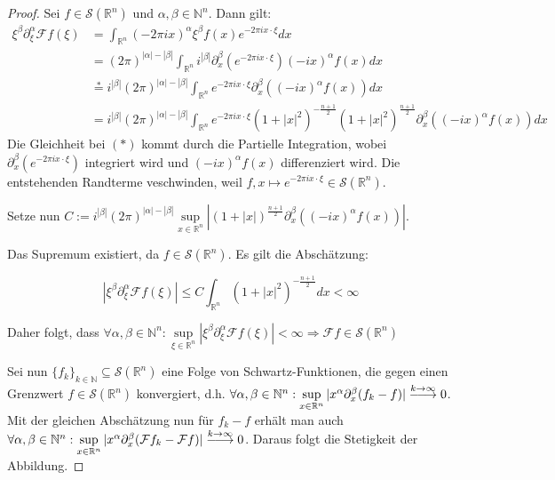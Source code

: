 \documentclass{article}
\newcommand{\R}[0]{\mathbb{R}}
\newcommand{\N}[0]{\mathbb{N}}
\newcommand{\F}[0]{\mathcal{F}}
\newcommand{\Ssp}[0]{\mathcal{S}}
\DeclareRobustCommand{\loongrightarrow}{%
  \DOTSB\relbar\joinrel\relbar\joinrel\rightarrow
}
\theoremstyle{plain}
\theoremstyle{definition}
\begin{document}
\begin{proof}\cite[S. 424, Theorem 24.1.1]{ebert2018methods}
    Sei $f \in \Ssp(\R^n)$ und $\alpha, \beta \in \N^n$. Dann gilt:
    \begin{align*}
        \xi^{\beta}\partial_{\xi}^{\alpha}\F f(\xi) &= \int_{\R^n} (-2\pi i x)^{\alpha} \xi^{\beta} f(x) e^{-2\pi i x \cdot \xi} dx \\
        &= (2\pi)^{|\alpha| - |\beta|} \int_{\R^n} i^{|\beta|} \partial_{x}^{\beta}(e^{-2\pi i x \cdot \xi}) (-ix)^{\alpha} f(x) dx \\
        &\overset{\text{*}}{=}i^{|\beta|}(2\pi)^{|\alpha| - |\beta|} \int_{\R^n} e^{-2\pi i x \cdot \xi} \partial_{x}^{\beta}((-ix)^{\alpha}f(x)) dx \\
        &= i^{|\beta|}(2\pi)^{|\alpha| - |\beta|} \int_{\R^n} e^{-2\pi i x \cdot \xi} (1+|x|^2)^{-\frac{n+1}{2}} (1+|x|^2)^{\frac{n+1}{2}} \partial_{x}^{\beta}((-ix)^{\alpha}f(x)) dx
    \end{align*}
    Die Gleichheit bei $(*)$ kommt durch die Partielle Integration, wobei $\partial_{x}^{\beta}(e^{-2\pi i x \cdot \xi})$ integriert wird und $(-ix)^{\alpha} f(x)$ differenziert wird. Die entstehenden Randterme veschwinden, weil $f, x \mapsto e^{-2\pi i x\cdot \xi} \in \Ssp(\R^n)$.
    
    Setze nun $C := i^{|\beta|}(2\pi)^{|\alpha| - |\beta|} \sup\limits_{x \in \R^n} |(1+|x|)^{\frac{n+1}{2}} \partial_{x}^{\beta}((-ix)^{\alpha}f(x))|$. 
    
    Das Supremum existiert, da $f \in \Ssp(\R^n)$. Es gilt die Abschätzung:
    
    \begin{equation*}
        |\xi^{\beta}\partial_{\xi}^{\alpha}\F f(\xi)| \leq C \int_{\R^n} (1+|x|^2)^{-\frac{n+1}{2}} dx < \infty
    \end{equation*}

    Daher folgt, dass $\forall \alpha, \beta\in \N^n: \sup\limits_{\xi \in \R^n} \left|\xi^{\beta}\partial_{\xi}^{\alpha}\F f(\xi)\right| < \infty \Rightarrow \F f \in \Ssp(\R^n)$

    Sei nun $\{f_k\}_{k\in\N} \subseteq \Ssp(\R^n)$ eine Folge von Schwartz-Funktionen, die gegen einen Grenzwert $f \in \Ssp(\R^n)$ konvergiert, 
    d.h. $\forall \alpha,\beta\in\N^n: \sup\limits_{x \in \R^n} |x^{\alpha}\partial_x^{\beta}(f_k - f)| \overset{k \to \infty}{\loongrightarrow} 0$.
    Mit der gleichen Abschätzung nun für $f_k - f$ erhält man auch $\forall \alpha,\beta\in\N^n: \sup\limits_{x \in \R^n} |x^{\alpha}\partial_x^{\beta}(\F f_k - \F f)| \overset{k \to \infty}{\loongrightarrow} 0$.
    Daraus folgt die Stetigkeit der Abbildung.
\end{proof}
\end{document}
